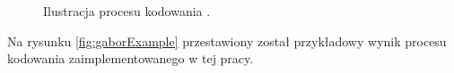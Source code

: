 \begin{figure}[!ht]
  \centering
  \caption{Ilustracja procesu kodowania \cite{masek}.}
  \label{fig:gaborEncoding}
\end{figure}

Na rysunku \ref{fig:gaborExample} przestawiony został przykładowy wynik procesu kodowania zaimplementowanego
w tej pracy.

